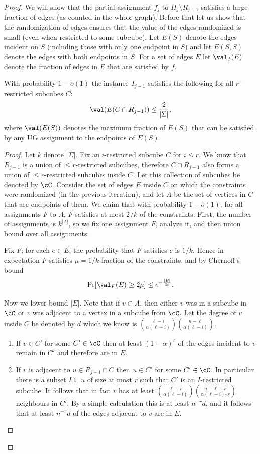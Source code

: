 \begin{proof}
We will show that the partial assignment $f_j$ to $H_j \setminus R_{j-1}$ satisfies a large fraction of edges (as counted in the whole graph). Before that let us show that the randomization of edges ensures that the value of the edges randomized is small (even when restricted to some subcube). Let $E(S)$ denote the edges incident on $S$ (including those with only one endpoint in $S$) and let $E(S,S)$ denote the edges with both endpoints in $S$. For a set of edges $E$ let $\val_f(E)$ denote the fraction of edges in $E$ that are satisfied by $f$.


\begin{claim}\label{claim:chernoff}
With probability $1-o(1)$ the instance $I_{j-1}$ satisfies the following for all $r$-restricted subcubes $C$:
\[\val(E(C \cap R_{j-1})) \leq \frac{2}{|\Sigma|},\]
where $\val(E(S))$ denotes the maximum fraction of $E(S)$ that can be satisfied by any UG assignment to the endpoints of $E(S)$.
\end{claim}

\begin{proof}
Let $k$ denote $|\Sigma|$. Fix an $i$-restricted subcube $C$ for $i \leq r$. We know that $R_{j-1}$ is a union of $\leq r$-restricted subcubes, therefore $C\cap R_{j-1}$ also forms a union of $\leq r$-restricted subcubes inside $C$. Let this collection of subcubes be denoted by $\cC$.
Consider the set of edges $E$ inside $C$ on which the constraints were randomized (in the previous iteration), and let $A$ be the set of vertices in $C$ that are endpoints of them. We claim that with probability $1-o(1)$,  for all assignments $F$ to $A$, $F$ satisfies at most $2/k$ of the constraints. First, the number of assignments is $k^{|A|}$, so we fix one assignment $F$, analyze it, and then union bound over all assignments.


Fix $F$; for each $e\in E$, the probability that $F$ satisfies $e$ is $1/k$. Hence in expectation $F$ satisfies
$\mu = 1/k$ fraction of the constraints, and by Chernoff’s bound
\[\Pr[\val_F(E) \geq 2\mu ]\leq e^{-\frac{|E|}{3k}}.\]

Now we lower bound $|E|$. Note that if $v\in A$, then either $v$ was in a subcube in $\cC$ or $v$ was adjacent to a vertex in a subcube from $\cC$. Let the degree of $v$ inside $C$ be denoted by $d$ which we know is ${\ell-i \choose \alpha(\ell - i)}{n-\ell \choose \alpha(\ell-i)}$.

\begin{enumerate}
    \item If $v \in C'$ for some $C' \in \cC$ then at least $(1-\alpha)^{r}$ of the edges incident to $v$ remain in $C'$ and therefore are in $E$. 
    \item If $v$ is adjacent to $u \in R_{j-1}\cap C$ then $u \in C'$ for some $C' \in \cC$. In particular there is a subset $I \subseteq u$ of size at most $r$ such that $C'$ is an $I$-restricted subcube. It follows that in fact $v$ has at least ${\ell-i \choose \alpha(\ell-i)}{n-\ell-r \choose \alpha(\ell-i) – r}$ neighbours in $C'$. By a simple calculation this is at least $n^{-r} d$, and it follows that at least $n^{-r} d$ of the edges adjacent to $v$ are in $E$.
\end{enumerate}


\end{proof}
\end{proof}
